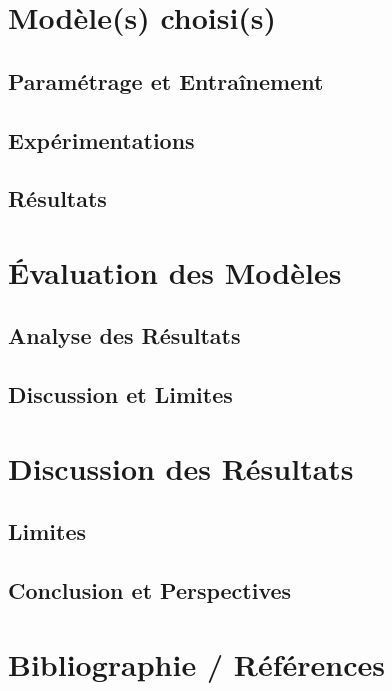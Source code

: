 \documentclass{rapport}
\begin{document}
\section{Modèle(s) choisi(s)}
\subsection{Paramétrage et Entraînement}
\subsection{Expérimentations}
\subsection{Résultats}

\section{Évaluation des Modèles}
\subsection{Analyse des Résultats}
\subsection{Discussion et Limites}

\section{Discussion des Résultats}
\subsection{Limites}
\subsection{Conclusion et Perspectives}

\section{Bibliographie / Références}



\end{document}

